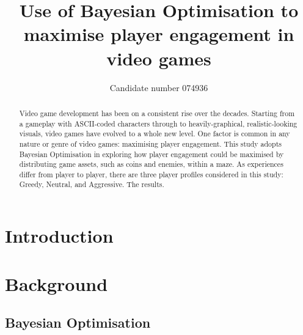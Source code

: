 \documentclass[sigconf]{IEEEtran}
\begin{document}
\title{Use of Bayesian Optimisation to maximise player engagement in video games}
\author{Candidate number 074936}

\maketitle
\begin{abstract}
    Video game development has been on a consistent rise over the decades. Starting from a gameplay with ASCII-coded characters through to heavily-graphical, realistic-looking visuals, video games have evolved to a whole new level. One factor is common in any nature or genre of video games: maximising player engagement. This study adopts Bayesian Optimisation in exploring how player engagement could be maximised by distributing game assets, such as coins and enemies, within a maze. As experiences differ from player to player, there are three player profiles considered in this study: Greedy, Neutral, and Aggressive. The results.\\
\end{abstract}

\vspace*{-1cm}
\section{Introduction}
\blindtext
\blindtext

\section{Background}
\blindtext
\subsection{Bayesian Optimisation}
\blindtext
\end{document}
